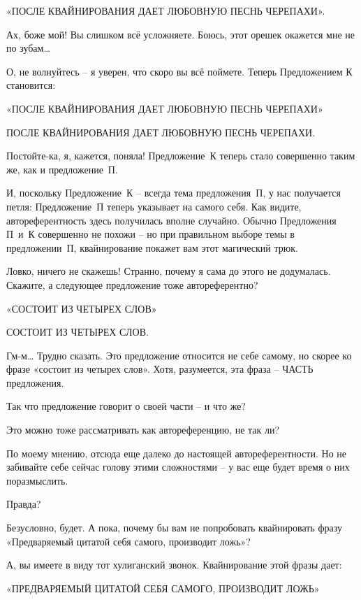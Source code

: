 \documentclass[../main.tex]{subfiles}
\begin{document}
\begin{Dialogue}
«ПОСЛЕ КВАЙНИРОВАНИЯ ДАЕТ ЛЮБОВНУЮ ПЕСНЬ ЧЕРЕПАХИ».

 Ах, боже мой! Вы слишком всё усложняете. Боюсь, этот орешек окажется мне не по зубам\ldots{}

 О, не волнуйтесь \--- я уверен, что скоро вы всё поймете. Теперь Предложением К становится:

«ПОСЛЕ КВАЙНИРОВАНИЯ ДАЕТ ЛЮБОВНУЮ ПЕСНЬ ЧЕРЕПАХИ»

ПОСЛЕ КВАЙНИРОВАНИЯ ДАЕТ ЛЮБОВНУЮ ПЕСНЬ ЧЕРЕПАХИ.

 Постойте-ка, я, кажется, поняла! Предложение~К теперь стало совершенно таким же, как и предложение~П.

 И, поскольку Предложение~К \--- всегда тема предложения~П, у нас получается петля: Предложение~П теперь указывает на самого себя. Как видите, автореферентность здесь получилась вполне случайно. Обычно Предложения П~и~К совершенно не похожи \--- но при правильном выборе темы в предложении~П, квайнирование покажет вам этот магический трюк.

 Ловко, ничего не скажешь! Странно, почему я сама до этого не додумалась. Скажите, а следующее предложение тоже автореферентно?

«СОСТОИТ ИЗ ЧЕТЫРЕХ СЛОВ»

СОСТОИТ ИЗ ЧЕТЫРЕХ СЛОВ.

 Гм-м\ldots{} Трудно сказать. Это предложение относится не себе самому, но скорее ко фразе «состоит из четырех слов». Хотя, разумеется, эта фраза \--- ЧАСТЬ предложения.

 Так что предложение говорит о своей части \--- и что же?

 Это можно тоже рассматривать как автореференцию, не так ли?

 По моему мнению, отсюда еще далеко до настоящей автореферентности. Но не забивайте себе сейчас голову этими сложностями \--- у вас еще будет время о них поразмыслить.

 Правда?

 Безусловно, будет. А пока, почему бы вам не попробовать квайнировать фразу «Предваряемый цитатой себя самого, производит ложь»?

 А, вы имеете в виду тот хулиганский звонок. Квайнирование этой фразы дает:

«ПРЕДВАРЯЕМЫЙ ЦИТАТОЙ СЕБЯ САМОГО, ПРОИЗВОДИТ ЛОЖЬ»


\end{Dialogue}
\end{document}
